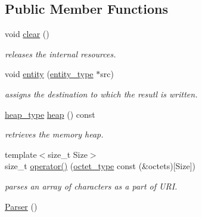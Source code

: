 \subsection*{Public Member Functions}
\begin{DoxyCompactItemize}
\item 
\hypertarget{classhryky_1_1uri_1_1_parser_a4720dad876d34dad6cc5af12f3a505a4}{void \hyperlink{classhryky_1_1uri_1_1_parser_a4720dad876d34dad6cc5af12f3a505a4}{clear} ()}\label{classhryky_1_1uri_1_1_parser_a4720dad876d34dad6cc5af12f3a505a4}

\begin{DoxyCompactList}\small\item\em releases the internal resources. \end{DoxyCompactList}\item 
\hypertarget{classhryky_1_1uri_1_1_parser_a6eb8dd233272d693f9cfc65c1faa7b8f}{void \hyperlink{classhryky_1_1uri_1_1_parser_a6eb8dd233272d693f9cfc65c1faa7b8f}{entity} (\hyperlink{classhryky_1_1uri_1_1_entity}{entity\-\_\-type} $\ast$src)}\label{classhryky_1_1uri_1_1_parser_a6eb8dd233272d693f9cfc65c1faa7b8f}

\begin{DoxyCompactList}\small\item\em assigns the destination to which the resutl is written. \end{DoxyCompactList}\item 
\hypertarget{classhryky_1_1parser_1_1_base_ade0723cedb648d9850423cc04fe4bdcf}{\hyperlink{classhryky_1_1memory_1_1heap_1_1_base}{heap\-\_\-type} \hyperlink{classhryky_1_1parser_1_1_base_ade0723cedb648d9850423cc04fe4bdcf}{heap} () const}\label{classhryky_1_1parser_1_1_base_ade0723cedb648d9850423cc04fe4bdcf}

\begin{DoxyCompactList}\small\item\em retrieves the memory heap. \end{DoxyCompactList}\item 
{\footnotesize template$<$size\-\_\-t Size$>$ }\\size\-\_\-t \hyperlink{classhryky_1_1uri_1_1_parser_a24916e6cafbb790e808562600515b4e8}{operator()} (\hyperlink{namespacehryky_a488cba8b666be33ccca70e819684e3c8}{octet\-\_\-type} const (\&octets)\mbox{[}Size\mbox{]})
\begin{DoxyCompactList}\small\item\em parses an array of characters as a part of U\-R\-I. \end{DoxyCompactList}\item 
\hypertarget{classhryky_1_1uri_1_1_parser_ac537e42fd0660ae3dda2e2602e33ec13}{\hyperlink{classhryky_1_1uri_1_1_parser_ac537e42fd0660ae3dda2e2602e33ec13}{Parser} ()}\label{classhryky_1_1uri_1_1_parser_ac537e42fd0660ae3dda2e2602e33ec13}


\end{DoxyCompactItemize}
